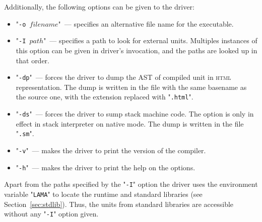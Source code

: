 Additionally, the following options can be given to the driver:

\begin{itemize}
\item "\texttt{-o $filename$}"~--- specifies an alternative file name for the executable. 
\item "\texttt{-I $path$}"~--- specifies a path to look for external units. Multiples instances of this option can be given in driver's
  invocation, and the paths are looked up in that order.
\item "\texttt{-dp}"~--- forces the driver to dump the AST of compiled unit in \textsc{html} representation. The dump is written in the file with the same
  basename as the source one, with the extension replaced with "\texttt{.html}".
\item "\texttt{-ds}"~--- forces the driver to sump stack machine code. The option is only in effect in stack interpreter on
  native mode. The dump is written in the file "\texttt{.sm}".
\item "\texttt{-v}"~--- makes the driver to print the version of the compiler.
\item "\texttt{-h}"~--- makes the driver to print the help on the options.
\end{itemize}

Apart from the paths specified by the "\texttt{-I}" option the driver uses the environment variable "\texttt{LAMA}"
to locate the runtime and standard libraries (see Section~\ref{sec:stdlib}). Thus, the units from standard libraries are accessible
without any "\texttt{-I}" option given.
